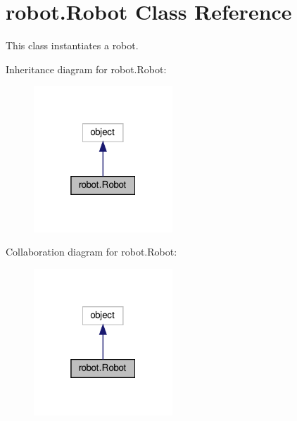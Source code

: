 \hypertarget{classrobot_1_1Robot}{}\section{robot.\+Robot Class Reference}
\label{classrobot_1_1Robot}


This class instantiates a robot.  




Inheritance diagram for robot.\+Robot\+:
\nopagebreak
\begin{figure}[H]
\begin{center}
\leavevmode
\includegraphics[width=148pt]{classrobot_1_1Robot__inherit__graph}
\end{center}
\end{figure}


Collaboration diagram for robot.\+Robot\+:
\nopagebreak
\begin{figure}[H]
\begin{center}
\leavevmode
\includegraphics[width=148pt]{classrobot_1_1Robot__coll__graph}
\end{center}
\end{figure}
